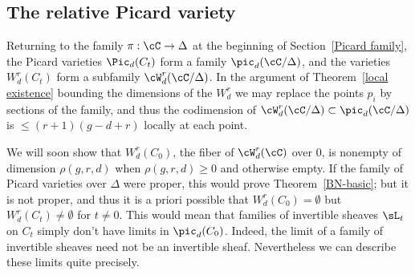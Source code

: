 
\subsection{The relative Picard variety}

Returning to the family $\pi : \cC \to \Delta$ at the beginning of Section~\ref{Picard family}, the Picard varieties $\Pic_d(C_t)$ form a family $\pic_d(\cC/\Delta)$, and the varieties $W^r_d(C_t)$ form a subfamily $\cW^r_d(\cC/\Delta)$.  In the argument
of Theorem~\ref{local existence} bounding  the dimensions of the $W^r_d$
we may replace the points $p_i$ by sections of the family, and thus
the codimension of $\cW^r_d(\cC/\Delta) \subset \pic_d(\cC/\Delta)$ is $\leq (r+1)(g-d+r)$ locally at each point.

We will soon show that $W^{r}_{d}(C_{0})$, the fiber of $\cW^{r}_{d}(\cC)$ over 0,  is nonempty of dimension $\rho(g,r,d)$ when $\rho(g,r,d)\geq 0$ and otherwise empty. If the family of Picard varieties over $\Delta$ were proper,
this would prove Theorem~\ref{BN-basic}; but it is not proper, and thus it is a priori possible that $W^{r}_{d}(C_{0})=\emptyset$ but $W^{r}_{d}(C_{t})\neq \emptyset$ for $t\neq 0$. This would mean that families of invertible sheaves $\sL_{t}$ on $C_{t}$  simply don't have  limits
in $\pic_{d}(C_{0})$. Indeed, the limit of a family of invertible sheaves need not be an invertible
sheaf. Nevertheless we can describe these limits quite precisely.



